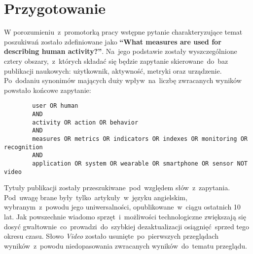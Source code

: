 \section{Przygotowanie}
W porozumieniu~z~promotorką pracy wstępne pytanie charakteryzujące temat poszukiwań zostało zdefiniowane jako \textbf{``What measures are used for describing human activity?''}. Na~jego podstawie zostały wyszczególnione cztery obszary,~z~których składać się będzie zapytanie skierowane~do~baz publikacji naukowych: użytkownik, aktywność, metryki oraz urządzenie. Po~dodaniu synonimów mających duży wpływ~na~liczbę zwracanych wyników powstało końcowe zapytanie:

\bigskip
\begin{center}
	\begin{minipage}{0.9\linewidth}
		\begin{verbatim}
		user OR human
		AND
		activity OR action OR behavior
		AND
		measures OR metrics OR indicators OR indexes OR monitoring OR recognition
		AND
		application OR system OR wearable OR smartphone OR sensor NOT video
		\end{verbatim}
	\end{minipage}
\end{center}
\bigskip

Tytuły publikacji zostały przeszukiwane~pod~względem słów~z~zapytania. Pod~uwagę brane były~tylko~artykuły~w~języku angielskim, wybranym~z~powodu jego uniwersalności, opublikowane~w~ciągu ostatnich 10 lat. Jak powszechnie wiadomo sprzęt~i~możliwości technologiczne zwiększają się dosyć gwałtownie~co~prowadzi~do~szybkiej dezaktualizacji osiągnięć~sprzed tego okresu czasu. Słowo \textit{Video} zostało usunięte~po~pierwszych przeglądach wyników~z~powodu niedopasowania zwracanych wyników~do~tematu przeglądu.
